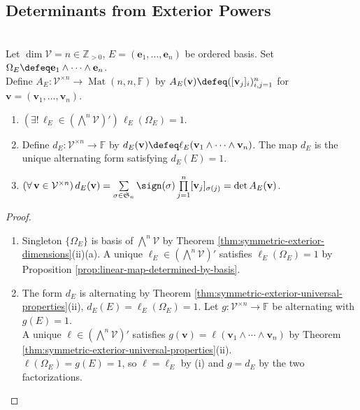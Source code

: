 \subsection{Determinants from Exterior Powers}

\begin{corollary} \label{cor:determinant-from-exterior-universal-property} \\
Let $\dim\mathcal{V}=n\in\mathbb{Z}_{>0}$, $E=(\mathbf{e}_1,\ldots,\mathbf{e}_n)$ be ordered basis. Set $\Omega_E\defeq\mathbf{e}_1\wedge\cdots\wedge\mathbf{e}_n$.\\
Define $A_E:\mathcal{V}^{\times n}\to\operatorname{Mat}(n,n,\mathbb{F})$ by $A_E(\mathbf{v})\defeq([\mathbf{v}_j]_i)_{i,j=1}^{n}$ for $\mathbf{v}=(\mathbf{v}_1,\ldots,\mathbf{v}_n)$.
\begin{enumerate}[label=(\roman*)]
\setlength{\itemsep}{0pt}
\item $(\exists!\,\ell_E\in(\bigwedge^n\mathcal{V})')\,\ell_E(\Omega_E)=1$.
\item Define $d_E:\mathcal{V}^{\times n}\to\mathbb{F}$ by $d_E(\mathbf{v})\defeq\ell_E(\mathbf{v}_1\wedge\cdots\wedge\mathbf{v}_n)$. The map $d_E$ is the unique alternating form satisfying $d_E(E)=1$.
\item $(\forall\,\mathbf{v}\in\mathcal{V}^{\times n})\,d_E(\mathbf{v})=\sum\limits_{\sigma\in\mathfrak{S}_n}\sign(\sigma)\prod\limits_{j=1}^{n}[\mathbf{v}_j]_{\sigma(j)}=\det A_E(\mathbf{v})$.
\end{enumerate}
\begin{proof}
\begin{enumerate}[label=(\roman*)]
\setlength{\itemsep}{0pt}
\item Singleton $\{\Omega_E\}$ is basis of $\bigwedge^n\mathcal{V}$ by Theorem \ref{thm:symmetric-exterior-dimensions}(ii)(a). A unique $\ell_E\in(\bigwedge^n\mathcal{V})'$ satisfies $\ell_E(\Omega_E)=1$ by Proposition \ref{prop:linear-map-determined-by-basis}.
\item The form $d_E$ is alternating by Theorem \ref{thm:symmetric-exterior-universal-properties}(ii), $d_E(E)=\ell_E(\Omega_E)=1$. Let $g:\mathcal{V}^{\times n}\to\mathbb{F}$ be alternating with $g(E)=1$.\\
A unique $\ell\in(\bigwedge^n\mathcal{V})'$ satisfies $g(\mathbf{v})=\ell(\mathbf{v}_1\wedge\cdots\wedge\mathbf{v}_n)$ by Theorem \ref{thm:symmetric-exterior-universal-properties}(ii).\\
$\ell(\Omega_E)=g(E)=1$, so $\ell=\ell_E$ by (i) and $g=d_E$ by the two factorizations.

\end{enumerate}
\end{proof}
\end{corollary}
